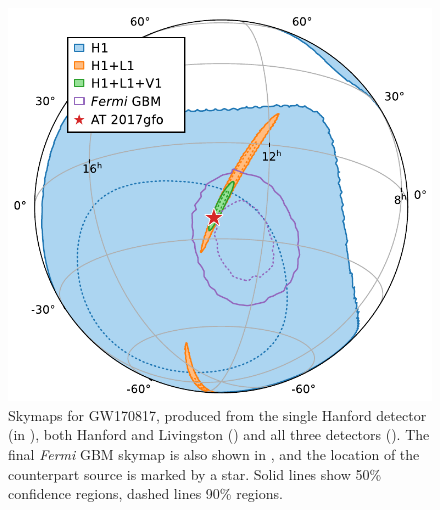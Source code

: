 \begin{colsection}
\begin{colsection}
\begin{figure}[p]
    \begin{center}
        \includegraphics[width=\linewidth]{images/skymaps.pdf}
    \end{center}
    \caption[Skymaps for GW170817]{
        Skymaps for GW170817, produced from the single Hanford detector (in ), both Hanford and Livingston () and all three detectors (). The final \textit{Fermi} GBM skymap is also shown in , and the location of the counterpart source is marked by a  star. Solid lines show 50\% confidence regions, dashed lines 90\% regions.
        }\label{fig:170817_skymaps}
\end{figure}

\end{colsection}


\end{colsection}


\newpage
